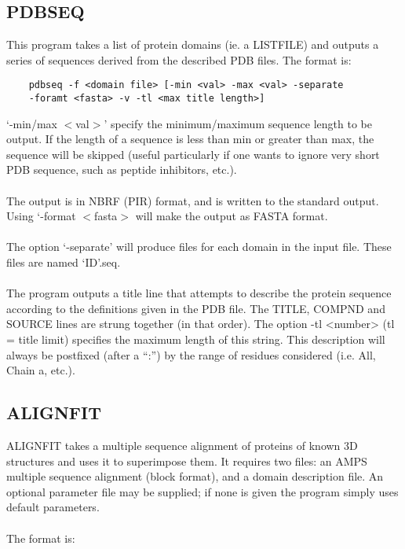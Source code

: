     \subsection{PDBSEQ}

    This program takes a list of protein domains (ie. a LISTFILE) and
    outputs a series of sequences derived from the described PDB
    files.  The format is:\\

    \begin{scriptsize}\begin{verbatim}
    pdbseq -f <domain file> [-min <val> -max <val> -separate 
    -foramt <fasta> -v -tl <max title length>]
    \end{verbatim} \end{scriptsize}

    `-min/max $<$val$>$' specify the minimum/maximum sequence length
    to be output.  If the length of a sequence is less than min or greater than max, the
    sequence will be skipped (useful particularly if one wants to ignore very short
    PDB sequence, such as peptide inhibitors, etc.).\\
    \\
    The output is in NBRF (PIR) format, and is written to the standard
    output.  Using `-format $<$fasta$>$ will make the output as FASTA
    format.\\
    \\
    The option `-separate' will produce files for each domain in the input file.
    These files are named `ID'.seq.\\
    \\
    The program outputs a title line that attempts to describe the protein
    sequence according to the definitions given in the PDB file.  The
    TITLE, COMPND and SOURCE lines are strung together (in that order).
    The option -tl <number> (tl = title limit) specifies the maximum length of this string.
    This description will always be postfixed (after a ``:'') by 
    the range of residues considered (i.e. All, Chain a, etc.).


    \subsection{ALIGNFIT}

    ALIGNFIT takes a multiple sequence alignment of proteins of known 3D structures
    and uses it to superimpose them. It requires two files: an 
    AMPS multiple sequence alignment (block format), and a domain 
    description file.  An optional parameter file may be supplied; if 
    none is given the program simply uses default parameters.\\
    \\
    The format is:\\

